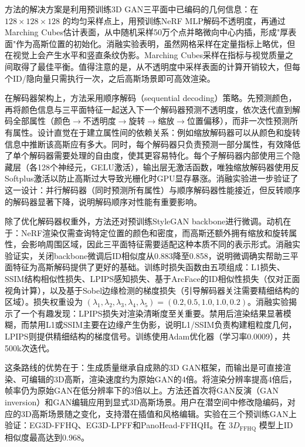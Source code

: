 方法的解决方案是利用预训练3D GAN三平面中已编码的几何信息：在 $128\times128\times128$ 的均匀采样点上，用预训练NeRF MLP解码不透明度，再通过Marching Cubes估计表面，从中随机采样50万个点并略微向中心内插，形成"厚表面"作为高斯位置的初始化。消融实验表明，虽然网格采样在定量指标上略优，但在视觉上会产生水平和竖直条纹伪影。Marching Cubes采样在指标与视觉质量之间取得了最佳平衡。值得注意的是，从不透明度中采样表面的计算开销较大，但每个ID/隐向量只需执行一次，之后高斯场景即可高效渲染。

在解码器架构上，方法采用顺序解码（sequential decoding）策略。先预测颜色，再将颜色信息与三平面特征一起送入下一个解码器预测不透明度，依次迭代直到解码全部属性（颜色$\to$不透明度$\to$旋转$\to$缩放$\to$位置偏移），而非一次性预测所有属性。设计直觉在于建立属性间的依赖关系：例如缩放解码器可以从颜色和旋转信息中推断该高斯应有多大。同时，每个解码器只负责预测一部分属性，有效降低了单个解码器需要处理的自由度，使其更容易特化。每个子解码器内部使用三个隐藏层（各128个神经元，GELU激活），输出层无激活函数，唯独缩放解码器使用反Softplus激活以防止高斯过大导致光栅化时GPU显存暴涨。消融实验进一步验证了这一设计：并行解码器（同时预测所有属性）与顺序解码器性能接近，但反转顺序的解码器显著下降，说明解码顺序对性能有重要影响。

除了优化解码器权重外，方法还对预训练StyleGAN backbone进行微调。动机在于：NeRF渲染仅需查询特定位置的颜色和密度，而高斯还额外拥有缩放和旋转属性，会影响周围区域，因此三平面特征需要适配这种本质不同的表示形式。消融实验证实，关闭backbone微调后ID相似度从0.883降至0.858，说明微调确实帮助三平面特征为高斯解码提供了更好的基础。训练时损失函数由五项组成：L1损失、SSIM结构相似性损失、LPIPS感知损失、基于ArcFace的ID相似性损失（仅对正面视角计算），以及基于Sobel边缘检测的梯度损失（引导解码器关注需要精细结构的区域）。损失权重设为 $(\lambda_1, \lambda_2, \lambda_3, \lambda_4, \lambda_5) = (0.2, 0.5, 1.0, 1.0, 0.2)$。消融实验揭示了一个有趣发现：LPIPS损失对渲染清晰度至关重要。禁用后渲染结果显著模糊，而禁用L1或SSIM主要在边缘产生伪影，说明L1/SSIM负责构建粗粒度几何，LPIPS则提供精细结构的梯度信号。训练使用Adam优化器（学习率0.0009），共500k次迭代。

这条路线的优势在于：生成质量继承自成熟的3D GAN框架，而输出是可直接渲染、可编辑的3D高斯，渲染速度约为原始GAN的4倍。将渲染分辨率提高4倍后，帧率仍为原始GAN在低分辨率下的3倍以上。方法还首次将GAN反演（GAN inversion）和GAN编辑应用到显式3D高斯场景。用户在潜空间中修改隐编码，对应的3D高斯场景随之变化，支持潜在插值和风格编辑。实验在三个预训练GAN上验证：EG3D-FFHQ、EG3D-LPFF和PanoHead-FFHQH。在 $3D_{\text{FFHQ}}$ 模型上ID相似度最高达到0.968。

